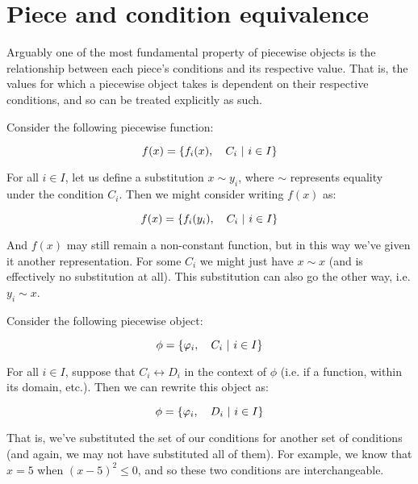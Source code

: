 \section{Piece and condition equivalence}
Arguably one of the most fundamental property of piecewise objects is the relationship between each piece's conditions and its respective value. That is, the values for which a piecewise object takes is dependent on their respective conditions, and so can be treated explicitly as such.

\begin{theorem}
    Consider the following piecewise function:

    $$
        f(x) = \left\{f_i(x),\quad C_i\ \middle|\ i\in I\right\}
    $$

    For all $i\in I$, let us define a substitution $x\sim y_i$, where $\sim$ represents equality under the condition $C_i$. Then we might consider writing $f(x)$ as:

    $$
        f(x) = \left\{f_i(y_i),\quad C_i\ \middle|\ i\in I\right\}
    $$

    And $f(x)$ may still remain a non-constant function, but in this way we've given it another representation. For some $C_i$ we might just have $x\sim x$ (and is effectively no substitution at all). This substitution can also go the other way, i.e. $y_i\sim x$.
\end{theorem}

\begin{theorem}
    Consider the following piecewise object:

    $$
        \phi=\left\{\varphi_i,\quad C_i\ \middle|\ i\in I\right\}
    $$

    For all $i\in I$, suppose that $C_i \leftrightarrow D_i$ in the context of $\phi$ (i.e. if a function, within its domain, etc.). Then we can rewrite this object as:

    $$
        \phi=\left\{\varphi_i,\quad D_i\ \middle|\ i\in I\right\}
    $$

    That is, we've substituted the set of our conditions for another set of conditions (and again, we may not have substituted all of them). For example, we know that $x=5$ when $(x-5)^2\leq 0$, and so these two conditions are interchangeable.
\end{theorem}

